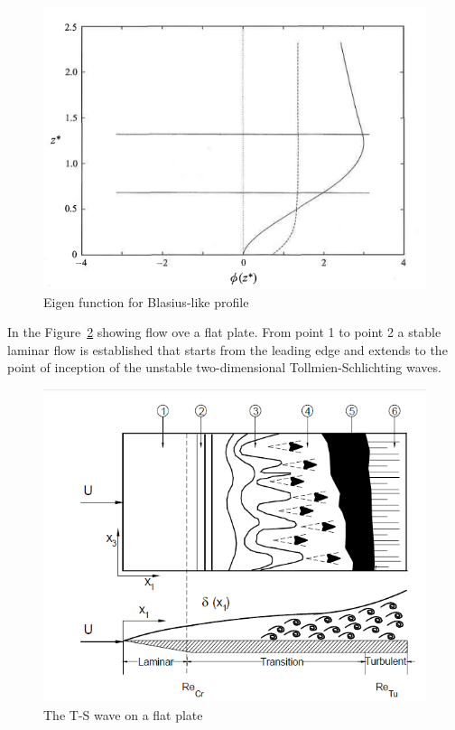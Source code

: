 \documentclass[twoside]{iitbreport}
\newcommand{\Figref}[1]{Figure~\ref{fig:#1}}
\begin{document}
\begin{enumerate}
\begin{figure}[h!]
      \centering
      \includegraphics[scale=0.5]{8.png}
      \caption{Eigen function for Blasius-like profile}
      \label{fig:8}
    \end{figure}
\end{enumerate}
In the \Figref{tswave} showing flow ove a flat plate. From point 1 to point 2 a stable
laminar flow is established that starts from the leading edge and extends
to the point of inception of the unstable two-dimensional
Tollmien-Schlichting waves.
\begin{figure}[h!]
  \centering
  \includegraphics[scale=0.5]{xyz.png}
  \caption{The T-S wave on a flat plate}
  \label{fig:tswave}
\end{figure}
\end{document}
